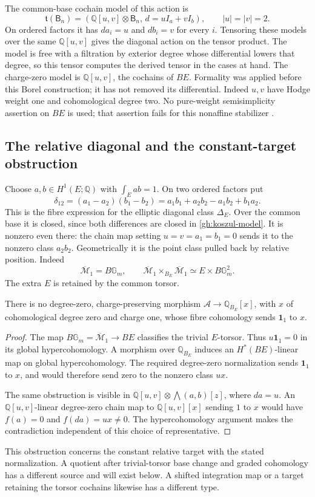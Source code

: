 The common-base cochain model of this action is
\begin{equation}\label{gh:koszul-model}
 \mathfrak t(\mathsf B_n)
 =\left(\mathbb Q[u,v]\otimes\mathsf B_n,\,
                         d=uI_a+vI_b\right),
 \qquad |u|=|v|=2.
\end{equation}
On ordered factors it has $da_i=u$ and $db_i=v$ for every $i$.
Tensoring these models over the same $\mathbb Q[u,v]$ gives the
diagonal action on the tensor product. The model is free with a
filtration by exterior degree whose differential lowers that degree,
so this tensor computes the derived tensor in the cases at hand.
The charge-zero model is $\mathbb Q[u,v]$, the cochains of $BE$.
Formality was applied before this Borel construction; it has not
removed its differential. Indeed $u,v$ have Hodge weight one and
cohomological degree two. No pure-weight semisimplicity assertion on
$BE$ is used; that assertion fails for this nonaffine stabilizer
\cite[Remark 3.25]{Tubach2025}.

\subsection{The relative diagonal and the constant-target obstruction}

Choose $a,b\in H^1(E;\mathbb Q)$ with $\int_E ab=1$.
On two ordered factors put
\begin{equation}\label{gh:diagonal}
 \delta_{12}=(a_1-a_2)(b_1-b_2)
 =a_1b_1+a_2b_2-a_1b_2+b_1a_2 .
\end{equation}
This is the fibre expression for the elliptic diagonal class
$\Delta_E$. Over the common base it is closed, since both differences
are closed in \eqref{gh:koszul-model}.
It is nonzero even there: the chain map setting
$u=v=a_1=b_1=0$ sends it to the nonzero class $a_2b_2$.
Geometrically it is the point class pulled back by relative position.
Indeed
\[
 \overline{\mathcal M}_1=B\mathbb G_m,\qquad
 \overline{\mathcal M}_1\times_{B_E}\overline{\mathcal M}_1
          \simeq E\times B\mathbb G_m^2.
\]
The extra $E$ is retained by the common torsor.

\begin{proposition}\label{gh:no-relative-rho}
There is no degree-zero, charge-preserving morphism
$\mathcal A\to\mathbb Q_{B_E}[x]$, with $x$ of cohomological degree
zero and charge one, whose fibre cohomology sends $\mathbf1_1$ to
$x$.
\end{proposition}
\begin{proof}
The map $B\mathbb G_m=\overline{\mathcal M}_1\to BE$ classifies
the trivial $E$-torsor. Thus $u\mathbf1_1=0$ in its global
hypercohomology. A morphism over $\mathbb Q_{B_E}$ induces an
$H^*(BE)$-linear map on global hypercohomology. The required
degree-zero normalization sends $\mathbf1_1$ to $x$, and would
therefore send zero to the nonzero class $ux$.

The same obstruction is visible in
$\mathbb Q[u,v]\otimes\bigwedge(a,b)[z]$, where $da=u$.
An $\mathbb Q[u,v]$-linear degree-zero chain map to
$\mathbb Q[u,v][x]$ sending $1$ to $x$ would have $f(a)=0$ and
$f(da)=ux\ne0$. The hypercohomology argument makes the
contradiction independent of this choice of representative.
\end{proof}

This obstruction concerns the constant relative target with the stated
normalization. A quotient after trivial-torsor base change and graded
cohomology has a different source and will exist below. A shifted
integration map or a target retaining the torsor cochains likewise
has a different type.
